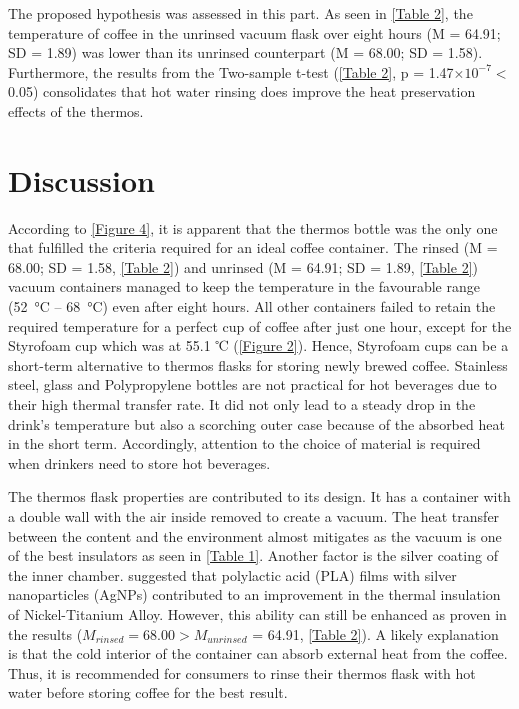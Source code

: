 \documentclass[11pt]{article}
\begin{document}
The proposed hypothesis was assessed in this part. As seen in \autoref{Table 2}, the temperature of coffee in the unrinsed vacuum flask over eight hours (M = 64.91; SD = 1.89) was lower than its unrinsed counterpart (M = 68.00; SD = 1.58). Furthermore, the results from the Two-sample t-test (\autoref{Table 2}, p = 1.47$\times10^{-7} < $ 0.05) consolidates that hot water rinsing does improve the heat preservation effects of the thermos.
\section*{Discussion}

According to \autoref{Figure 4}, it is apparent that the thermos bottle was the only one that fulfilled the criteria required for an ideal coffee container. The rinsed (M = 68.00; SD = 1.58, \autoref{Table 2}) and unrinsed (M = 64.91; SD = 1.89, \autoref{Table 2}) vacuum containers managed to keep the temperature in the favourable range (\SI{52}{\celsius} – \SI{68}{\celsius}) even after eight hours. All other containers failed to retain the required temperature for a perfect cup of coffee after just one hour, except for the Styrofoam cup which was at 55.1 ℃ (\autoref{Figure 2}). Hence, Styrofoam cups can be a short-term alternative to thermos flasks for storing newly brewed coffee. Stainless steel, glass and Polypropylene bottles are not practical for hot beverages due to their high thermal transfer rate. It did not only lead to a steady drop in the drink’s temperature but also a scorching outer case because of the absorbed heat in the short term. Accordingly, attention to the choice of material is required when drinkers need to store hot beverages.

The thermos flask properties are contributed to its design. It has a container with a double wall with the air inside removed to create a vacuum. The heat transfer between the content and the environment almost mitigates as the vacuum is one of the best insulators as seen in \autoref{Table 1}. Another factor is the silver coating of the inner chamber. \citeauthor{Liu2020} suggested that polylactic acid (PLA) films with silver nanoparticles (AgNPs) contributed to an improvement in the thermal insulation of Nickel-Titanium Alloy. However, this ability can still be enhanced as proven in the results ($M_{rinsed} = 68.00 > M_{unrinsed}$ = 64.91, \autoref{Table 2}). A likely explanation is that the cold interior of the container can absorb external heat from the coffee. Thus, it is recommended for consumers to rinse their thermos flask with hot water before storing coffee for the best result.
\end{document}
